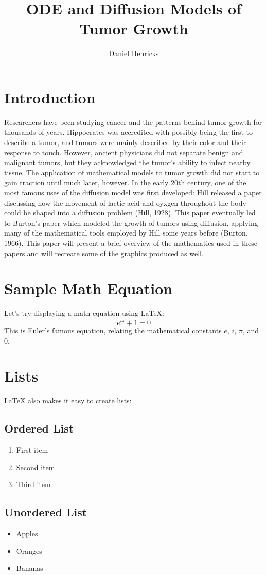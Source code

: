 \documentclass{article}
\title{ODE and Diffusion Models of Tumor Growth}
\author{Daniel Henricks}
\begin{document}
\maketitle

\section{Introduction}

Researchers have been studying cancer and the patterns behind tumor growth for thousands of years. Hippocrates
was accredited with possibly being the first to describe a tumor, and tumors were mainly described by their color
and their response to touch. However, ancient physicians did not separate benign and malignant tumors, but they
acknowledged the tumor's ability to infect nearby tissue. The application of mathematical models to tumor growth
did not start to gain traction until much later, however. In the early 20th century, one of the most famous uses of
the diffusion model was first developed: Hill released a paper discussing how the movement of lactic acid
and oyxgen throughout the body could be shaped into a diffusion problem (Hill, 1928). This paper eventually led to
Burton's paper which modeled the growth of tumors using diffusion, applying many of the mathematical tools employed
by Hill some years before (Burton, 1966). This paper will present a brief overview of the mathematics used in these
papers and will recreate some of the graphics produced as well.

\section{Sample Math Equation}
Let's try displaying a math equation using LaTeX:
\[
    e^{i \pi} + 1 = 0
\]
This is Euler's famous equation, relating the mathematical constants $e$, $i$, $\pi$, and $0$.

\section{Lists}
LaTeX also makes it easy to create lists:

\subsection{Ordered List}
\begin{enumerate}
    \item First item
    \item Second item
    \item Third item
\end{enumerate}

\subsection{Unordered List}
\begin{itemize}
    \item Apples
    \item Oranges
    \item Bananas
\end{itemize}
\end{document}
